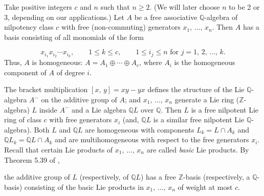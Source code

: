 \documentclass[mathscr]{amsart}
\theoremstyle{theorem}
\theoremstyle{definition}
\numberwithin{equation}{section}
\begin{document}
Take positive integers $c$ and $n$ such that $n\geq 2$.  (We will
later choose $n$ to be 2 or 3, depending on our applications.)  Let
$A$ be a free associative $\mathbb{Q}$-algebra of nilpotency class
$c$ with free (non-commuting) generators $x_1,\,\dots,\,x_n$.  Then
$A$ has a basis consisting of all monomials of the form

$$x_{i_1}x_{i_2}\cdots x_{i_k},\qquad 1\leq k \leq c,\qquad 1\leq
i_j\leq n\text{ for }j=1,\,2,\,\dots,\,k.$$ Thus, $A$ is
homogeneous: $A=A_1\oplus \cdots \oplus A_c$, where $A_i$ is the
homogeneous component of $A$ of degree $i$.

The bracket multiplication $[x,\,y]=xy-yx$ defines the structure of
the Lie $\mathbb{Q}$-algebra $A^{-}$ on the additive group of $A$;
and $x_1,\,\dots,\,x_n$ generate a Lie ring ($\mathbb{Z}$-algebra)
$L$ inside $A^{-}$ and a Lie algebra $\mathbb{Q}L$ over
$\mathbb{Q}$. Then $L$ is a free nilpotent Lie ring of class $c$
with free generators $x_i$ (and, $\mathbb{Q}L$ is a similar free
nilpotent Lie $\mathbb{Q}$-algebra).  Both $L$ and $\mathbb{Q}L$ are
homogeneous with components $L_k=L\cap A_k$ and
$\mathbb{Q}L_k=\mathbb{Q}L\cap A_k$ and are multihomogeneous with
respect to the free generators $x_i$.  Recall that certain Lie
products of $x_1,\,\dots,\,x_n$ are called {\it basic} Lie products.
By Theorem 5.39 of \cite{Kh},



\bigskip
\qquad the additive group of $L$ (respectively, of $ \mathbb{Q}L$)
has a free $\mathbb{Z}$-basis (respectively, a $\mathbb{Q}$-basis)
consisting of the basic Lie products in $x_1,\,\dots,\,x_n$ of
weight at most $c$. \vspace{-1.02cm}
\begin{equation}\label{eq4.1-3-28}
\end{equation}
\smallskip
\end{document}
